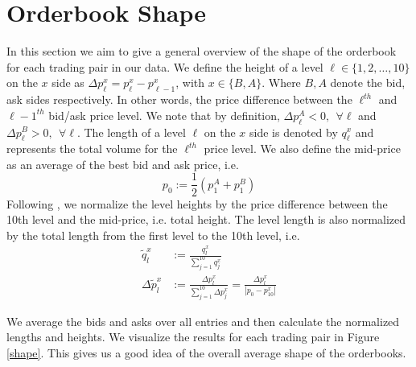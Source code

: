 \clearpage

\section{Orderbook Shape}

In this section we aim to give a general overview of the shape of the orderbook for each trading pair in our data.
We define the height of a level $\ell \in \{ 1, 2, \dots, 10 \}$ on the $x$ side as $\Delta p_{\ell}^x = p_{\ell}^x - p_{\ell-1}^x$, with $x \in{\{ B,A \}}$. 
Where $B,A$ denote the bid, ask sides respectively. 
In other words, the price difference between the $\ell^{th}$ and $\ell-1^{th}$ bid/ask price level.
We note that by definition, $\Delta p_{\ell}^A < 0, ~ ~ \forall \ell$ and $\Delta p_{\ell}^B > 0, ~ ~ \forall \ell$.
The length of a level $\ell$ on the $x$ side is denoted by $q^x_{\ell}$ and represents the total volume
for the $\ell^{th}$ price level.
We also define the mid-price as an average of the best bid and ask price, i.e.
\begin{equation}
    p_0 := \frac{1}{2} (p^A_{1} + p^B_{1}) \label{mid}
\end{equation}
Following \cite{CAO2009}, we normalize the level heights by the price difference
between the 10th level and the mid-price, i.e. total height. 
The level length is also normalized by the total length from the first level to the 10th level, i.e.
\begin{align}
    \tilde{q}_{l}^x &:= \frac{q_{l}^x}{\sum_{j=1}^{10} q_{j}^x}  \\
    \Delta\tilde{p}_{l}^x &:= \frac{\Delta p_{l}^x}{\sum_{j=1}^{10} \Delta p_{j}^x} = \frac{\Delta p_{l}^x}{|p_{0} - p_{10}^x|}
\end{align}

We average the bids and asks over all entries and then calculate the normalized lengths
and heights. We visualize the results for each trading pair in Figure \ref{shape}.
This gives us a good idea of the overall average shape of the orderbooks.

